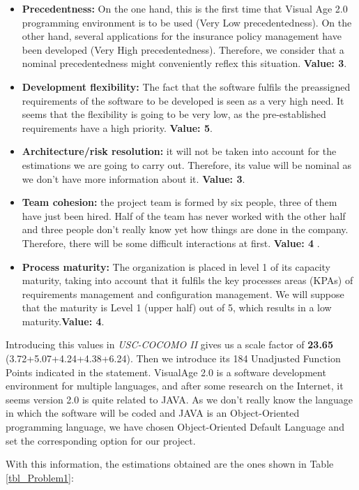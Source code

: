\begin{itemize}
\item \textbf{Precedentness:} On the one hand, this is the first time that Visual Age 2.0 programming environment is to be used (Very Low precedentedness). On the other hand, several applications for the insurance policy management have been developed (Very High precedentedness). Therefore, we consider that a nominal precedentedness might conveniently reflex this situation. \textbf{Value: 3}.
\item \textbf{Development flexibility:} The fact that the software fulfils the preassigned requirements of the software to be developed is seen as a very high need. It seems that the flexibility is going to be very low, as the pre-established requirements have a high priority. \textbf{Value: 5}.
\item \textbf{Architecture/risk resolution:} it will not be taken into account for the estimations we are going to carry out. Therefore, its value will be nominal as we don't have more information about it. \textbf{Value: 3}.
\item \textbf{Team cohesion:} the project team is formed by six people, three of them have just been hired. Half of the team has never worked with the other half and three people don't really know yet how things are done in the company. Therefore, there will be some difficult interactions at first. \textbf{Value: 4} .
\item \textbf{Process maturity:} The organization is placed in level 1 of its capacity maturity, taking into account that it fulfils the key processes areas (KPAs) of requirements management and configuration management. We will suppose that the maturity is Level 1 (upper half) out of 5, which results in a low maturity.\textbf{Value: 4}.
\end{itemize}

Introducing this values in \textit{USC-COCOMO II} gives us a scale factor of \textbf{23.65} (3.72+5.07+4.24+4.38+6.24). Then we introduce its 184 Unadjusted Function Points indicated in the statement. VisualAge 2.0 is a software development environment for multiple languages, and after some research on the Internet, it seems version 2.0 is quite related to JAVA. As we don't really know the language in which the software will be coded and JAVA is an Object-Oriented programming language, we have chosen Object-Oriented Default Language and set the corresponding option for our project.

With this information, the estimations obtained are the ones shown in Table \ref{tbl_Problem1}:

